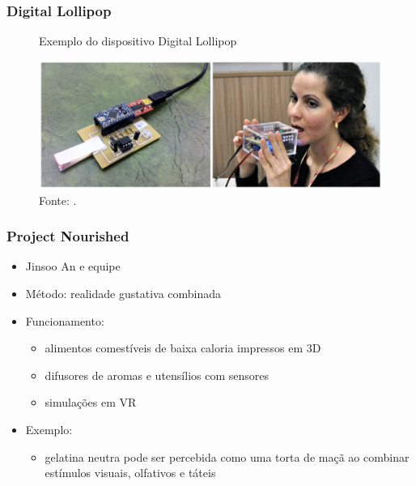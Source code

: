 \documentclass{beamer}
\begin{document}
\begin{frame}
  \frametitle{Digital Lollipop}
  \begin{figure}[h]
    \centering
    \caption{Exemplo do dispositivo Digital Lollipop}
    \vspace{-18pt}
    \includegraphics[width=1.03\textwidth]{img_DigitalLollipop.png}
    \vspace{-20pt}
    \caption*{Fonte: \cite{ranasingheDigitalLollipopStudying2016}.}
  \end{figure}
\end{frame}

\begin{frame}
  \frametitle{Project Nourished}
  \begin{itemize}
    \item Jinsoo An e equipe
    \item Método: realidade gustativa combinada
    \item Funcionamento:
    \begin{itemize}
      \item  alimentos comestíveis de baixa caloria impressos em 3D
      \item difusores de aromas e utensílios com sensores
      \item simulações em VR
    \end{itemize}
    \item Exemplo:
    \begin{itemize}
      \item gelatina neutra pode ser percebida como uma torta de maçã ao combinar estímulos visuais, olfativos e táteis
    \end{itemize}
  \end{itemize}
\end{frame}
\end{document}

